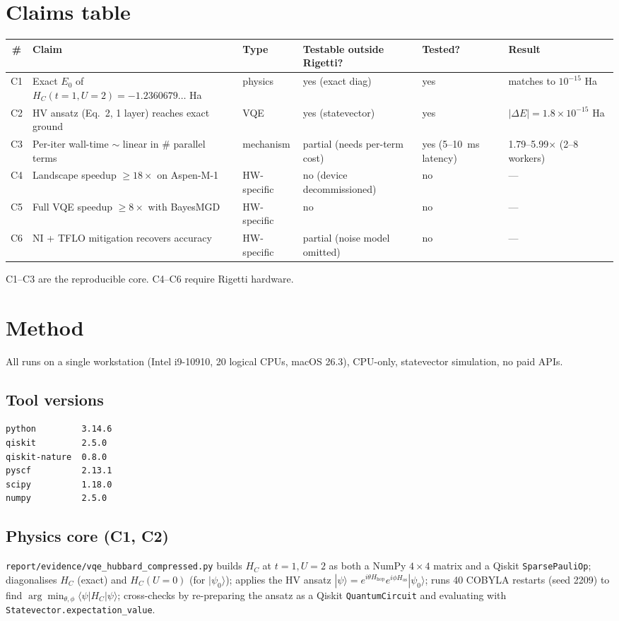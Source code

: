 \documentclass[11pt]{article}
\begin{document}
\section{Claims table}

\begin{longtable}{@{}clllll@{}}
\toprule
\# & Claim & Type & Testable outside Rigetti? & Tested? & Result \\
\midrule
C1 & Exact $E_0$ of $H_C(t{=}1,U{=}2) = -1.2360679\ldots$ Ha & physics & yes (exact diag) & yes & matches to $10^{-15}$ Ha \\
C2 & HV ansatz (Eq.~2, 1 layer) reaches exact ground & VQE & yes (statevector) & yes & $|\Delta E| = 1.8 \times 10^{-15}$ Ha \\
C3 & Per-iter wall-time $\sim$ linear in \# parallel terms & mechanism & partial (needs per-term cost) & yes (5--10~ms latency) & 1.79--5.99$\times$ (2--8 workers) \\
C4 & Landscape speedup $\geq 18\times$ on Aspen-M-1 & HW-specific & no (device decommissioned) & no & --- \\
C5 & Full VQE speedup $\geq 8\times$ with BayesMGD & HW-specific & no & no & --- \\
C6 & NI + TFLO mitigation recovers accuracy & HW-specific & partial (noise model omitted) & no & --- \\
\bottomrule
\end{longtable}

C1--C3 are the reproducible core. C4--C6 require Rigetti hardware.

\section{Method}

All runs on a single workstation (Intel i9-10910, 20 logical CPUs, macOS 26.3), CPU-only, statevector simulation, no paid APIs.

\subsection{Tool versions}
\begin{lstlisting}
python         3.14.6
qiskit         2.5.0
qiskit-nature  0.8.0
pyscf          2.13.1
scipy          1.18.0
numpy          2.5.0
\end{lstlisting}

\subsection{Physics core (C1, C2)}
\texttt{report/evidence/vqe\_hubbard\_compressed.py} builds $H_C$ at $t=1,U=2$ as both a NumPy $4\times 4$ matrix and a Qiskit \texttt{SparsePauliOp}; diagonalises $H_C$ (exact) and $H_C(U{=}0)$ (for $|\psi_0\rangle$); applies the HV ansatz $|\psi\rangle = e^{i\theta H_{\mathrm{hop}}} e^{i\phi H_{\mathrm{os}}} |\psi_0\rangle$; runs 40 COBYLA restarts (seed 2209) to find $\arg\min_{\theta,\phi} \langle\psi|H_C|\psi\rangle$; cross-checks by re-preparing the ansatz as a Qiskit \texttt{QuantumCircuit} and evaluating with \texttt{Statevector.expectation\_value}.
\end{document}
